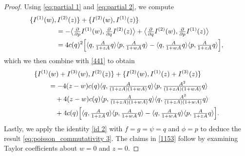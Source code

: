 \documentclass[10pt,a4paper]{amsart}
\newcommand{\la}{\langle}
\newcommand{\ra}{\rangle}
\begin{document}
\begin{proof}
Using \eqref{eq:partial 1} and \eqref{eq:partial 2}, we compute
\begin{align}\label{440}
\{I^{(1)}(w),&\, I ^{(2)}(z) \}+ \{I^{(2)}(w),I ^{(1)}(z) \} \notag\\
&= -\bigl\langle \tfrac{\partial}{\partial p} I^{(1)}(w),\tfrac{\partial}{\partial q} I^{(2)}(z) \bigr\rangle
	+ \bigl\langle \tfrac{\partial}{\partial q} I^{(2)}(w),\tfrac{\partial}{\partial p} I^{(1)}(z) \bigr\rangle\\
&=4c(q)^2 \Bigl[ \la q,\tfrac{A}{1+zA}q\ra \la p, \tfrac{A}{1+wA}q\ra  -  \la q, \tfrac{A}{1+wA}q\ra \la p,\tfrac{A}{1+zA}q\ra \Bigr], \notag
\end{align}
which we then combine with \eqref{441} to obtain
\begin{align*}
\{I^{(1)}&(w)+I^{(3)}(w),I ^{(2)}(z) \} +	\{I^{(2)}(w),I ^{(1)}(z)+I ^{(3)}(z) \} \\
&=-4(z-w)c(q)\la q, \tfrac{A}{(1+z A)(1+wA)}q\ra \la p, \tfrac{A^2}{(1+z A)(1+wA)} q\ra\\
&\quad+4(z-w)c(q)\la p, \tfrac{A}{(1+z A)(1+wA)}q\ra \la q, \tfrac{A^2}{(1+z A)(1+wA)} q\ra\notag\\
&\quad + 4c(q) \Bigl[ \la q, \tfrac{A}{1+zA}q\ra \la p, \tfrac{A}{1+wA}q\ra - 
	\la q, \tfrac{A}{1+wA}q\ra \la p, \tfrac{A}{1+zA}q\ra  \Bigr]. \notag
\end{align*}
Lastly, we apply the identity \eqref{id 2} with $f=g=\psi= q$ and $\phi=p$ to deduce the result \eqref{eq:poisson_commutativity 3}.  The claims in \eqref{1153} follow by examining Taylor coefficients about $w=0$ and $z=0$.
\end{proof}
\end{document}
